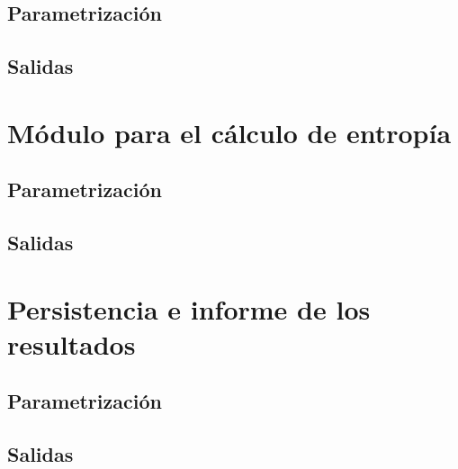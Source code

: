 \subsection{Parametrización}
\subsection{Salidas}
\section{Módulo para el cálculo de entropía}
\subsection{Parametrización}
\subsection{Salidas}
\section{Persistencia e informe de los resultados}
\subsection{Parametrización}
\subsection{Salidas}
